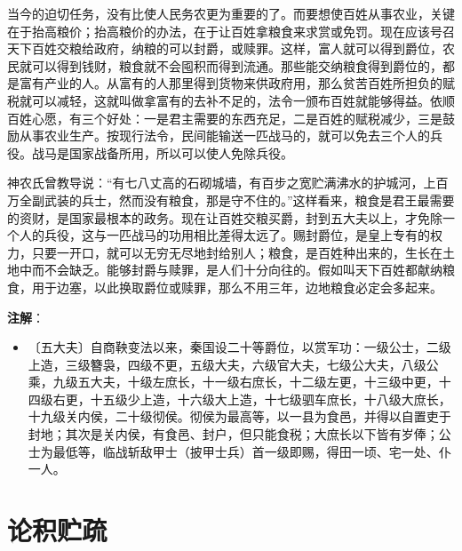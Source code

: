 \documentclass[12pt,UTF-8,openany]{ctexbook}
\begin{document}
\begin{normalsize}
    当今的迫切任务，没有比使人民务农更为重要的了。而要想使百姓从事农业，关键在于抬高粮价；抬高粮价的办法，在于让百姓拿粮食来求赏或免罚。现在应该号召天下百姓交粮给政府，纳粮的可以封爵，或赎罪。这样，富人就可以得到爵位，农民就可以得到钱财，粮食就不会囤积而得到流通。那些能交纳粮食得到爵位的，都是富有产业的人。从富有的人那里得到货物来供政府用，那么贫苦百姓所担负的赋税就可以减轻，这就叫做拿富有的去补不足的，法令一颁布百姓就能够得益。依顺百姓心愿，有三个好处：一是君主需要的东西充足，二是百姓的赋税减少，三是鼓励从事农业生产。按现行法令，民间能输送一匹战马的，就可以免去三个人的兵役。战马是国家战备所用，所以可以使人免除兵役。
    
    神农氏曾教导说：“有七八丈高的石砌城墙，有百步之宽贮满沸水的护城河，上百万全副武装的兵士，然而没有粮食，那是守不住的。”这样看来，粮食是君王最需要的资财，是国家最根本的政务。现在让百姓交粮买爵，封到五大夫以上，才免除一个人的兵役，这与一匹战马的功用相比差得太远了。赐封爵位，是皇上专有的权力，只要一开口，就可以无穷无尽地封给别人；粮食，是百姓种出来的，生长在土地中而不会缺乏。能够封爵与赎罪，是人们十分向往的。假如叫天下百姓都献纳粮食，用于边塞，以此换取爵位或赎罪，那么不用三年，边地粮食必定会多起来。
    
\end{normalsize}


\newpage

\textbf{注解}：

\vspace{-1em}

\begin{itemize}
    \setlength\itemsep{-0.2em}
    \item〔五大夫〕自商鞅变法以来，秦国设二十等爵位，以赏军功：一级公士，二级上造，三级簪袅，四级不更，五级大夫，六级官大夫，七级公大夫，八级公乘，九级五大夫，十级左庶长，十一级右庶长，十二级左更，十三级中更，十四级右更，十五级少上造，十六级大上造，十七级驷车庶长，十八级大庶长，十九级关内侯，二十级彻侯。彻侯为最高等，以一县为食邑，并得以自置吏于封地；其次是关内侯，有食邑、封户，但只能食税；大庶长以下皆有岁俸；公士为最低等，临战斩敌甲士（披甲士兵）首一级即赐，得田一顷、宅一处、仆一人。
\end{itemize}

\chapter{论积贮疏}
\end{document}
